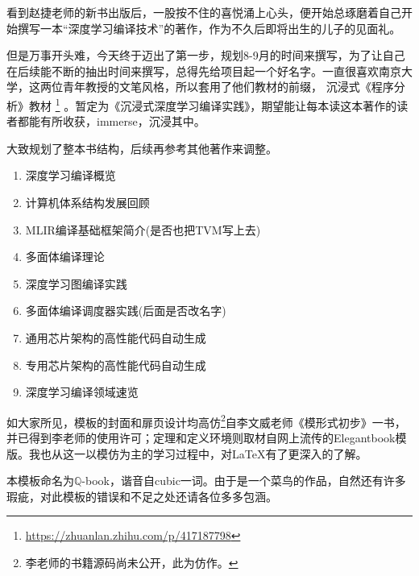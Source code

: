 \begin{overview}
\thispagestyle{empty}

看到赵捷老师的新书出版后，一股按不住的喜悦涌上心头，便开始总琢磨着自己开始撰写一本“深度学习编译技术”的著作，作为不久后即将出生的儿子的见面礼。

但是万事开头难，今天终于迈出了第一步，规划8-9月的时间来撰写，为了让自己在后续能不断的抽出时间来撰写，总得先给项目起一个好名字。一直很喜欢南京大学，这两位青年教授的文笔风格，所以套用了他们教材的前缀，
沉浸式《程序分析》教材
\footnote{\url{https://zhuanlan.zhihu.com/p/417187798}}
。暂定为《沉浸式深度学习编译实践》，期望能让每本读这本著作的读者都能有所收获，immerse，沉浸其中。

大致规划了整本书结构，后续再参考其他著作来调整。

\begin{enumerate}
	\item 深度学习编译概览
	\item 计算机体系结构发展回顾
	\item MLIR编译基础框架简介(是否也把TVM写上去)
    \item 多面体编译理论
    \item 深度学习图编译实践
    \item 多面体编译调度器实践(后面是否改名字)
    \item 通用芯片架构的高性能代码自动生成
    \item 专用芯片架构的高性能代码自动生成
    \item 深度学习编译领域速览
\end{enumerate}

如大家所见，模板的封面和扉页设计均高仿\footnote{李老师的书籍源码尚未公开，此为仿作。}自李文威老师《模形式初步》一书，并已得到李老师的使用许可；定理和定义环境则取材自网上流传的Elegantbook模版。我也从这一以模仿为主的学习过程中，对\LaTeX 有了更深入的了解。

本模板命名为$\mathbb{ Q }$-book，谐音自cubic一词。由于是一个菜鸟的作品，自然还有许多瑕疵，对此模板的错误和不足之处还请各位多多包涵。

\end{overview}
